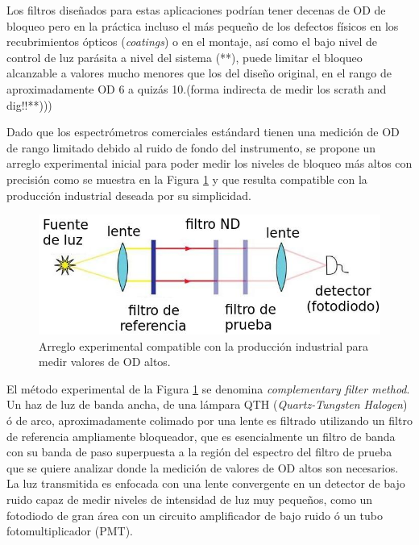 \documentclass{ctuthesis}
\begin{document}
Los filtros 
diseñados para estas aplicaciones podrían tener decenas de OD de bloqueo pero 
en 
la práctica incluso el más pequeño de los defectos físicos en los 
recubrimientos ópticos (\textit{coatings}) o en el montaje, así como el bajo 
nivel de control de luz parásita a nivel del sistema (**), puede limitar el 
bloqueo alcanzable a valores mucho menores que los del diseño original, en el 
rango de aproximadamente OD 6 a quizás 10.(forma indirecta de medir los scrath 
and dig!!**))) 

Dado que los espectrómetros 
comerciales estándard tienen una medición de OD de rango limitado debido al 
ruido de fondo del instrumento, se propone un arreglo experimental inicial para 
poder medir los niveles de bloqueo más altos con precisión como se muestra en 
la Figura \ref{fig:su} y que resulta compatible con la producción industrial 
deseada por su simplicidad.


\begin{figure}[h!]
	\centering
	\includegraphics[scale=1.0]{Figs/plan_de_tesis/setup_u.jpeg}
	\caption{Arreglo experimental compatible con la producción industrial para 
	medir valores de 
	OD altos.}
	\label{fig:su}
\end{figure}

El método experimental de la Figura \ref{fig:su} se denomina 
\textit{complementary filter method}. Un haz de 
luz de banda ancha, de una lámpara QTH 
(\textit{Quartz-Tungsten Halogen}) ó de arco, aproximadamente colimado por una 
lente  es filtrado utilizando un filtro 
de referencia ampliamente bloqueador, que es esencialmente un filtro de banda 
con su banda de paso superpuesta a la región del espectro del filtro de prueba 
que se quiere analizar donde la medición de valores de OD altos son necesarios. 
La luz transmitida es enfocada con una lente convergente en un detector de bajo 
ruido capaz de medir niveles de intensidad de luz muy pequeños, como un 
fotodiodo de gran área con un circuito amplificador de bajo ruido ó un tubo 
fotomultiplicador (PMT).
\end{document}
